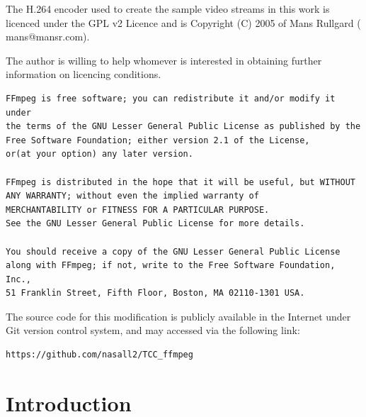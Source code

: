 \documentclass[
	12pt,				%
	openright,			%
	twoside,			%
	a4paper,			%
	brazil,
	french,				%
	english
	]{abntex2}
\begin{document}
The H.264 encoder used to create the sample video streams in this work is licenced under the GPL v2 Licence and is Copyright (C) 2005 of Mans Rullgard ( mans@mansr.com).

The author is willing to help whomever is interested in obtaining further information on licencing conditions.

\begin{verbatim}
FFmpeg is free software; you can redistribute it and/or modify it under
the terms of the GNU Lesser General Public License as published by the
Free Software Foundation; either version 2.1 of the License,
or(at your option) any later version.

FFmpeg is distributed in the hope that it will be useful, but WITHOUT
ANY WARRANTY; without even the implied warranty of
MERCHANTABILITY or FITNESS FOR A PARTICULAR PURPOSE.
See the GNU Lesser General Public License for more details.

You should receive a copy of the GNU Lesser General Public License
along with FFmpeg; if not, write to the Free Software Foundation, Inc.,
51 Franklin Street, Fifth Floor, Boston, MA 02110-1301 USA.
\end{verbatim}

The source code for this modification is publicly available in the Internet under Git version control system, and may accessed via the following link:
\begin{verbatim}
https://github.com/nasall2/TCC_ffmpeg
\end{verbatim}
 
\chapter[Introduction]{Introduction}

\end{document}
